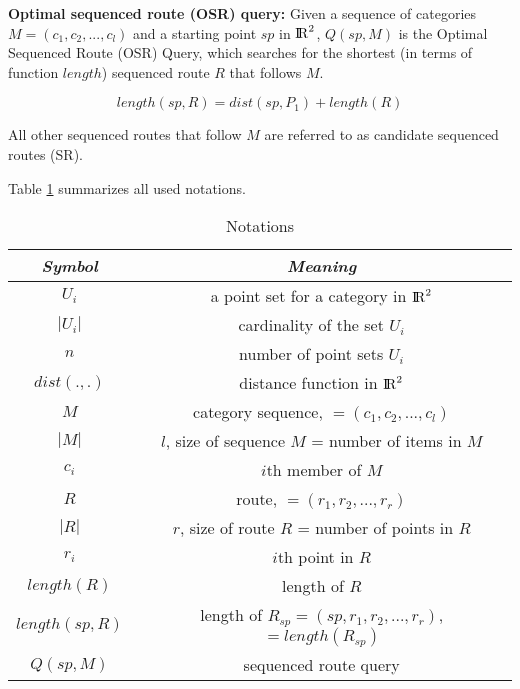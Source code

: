 \textbf{Optimal sequenced route (OSR) query:} Given a sequence of categories $M = (c_1, c_2, ..., c_l)$ and a starting point $sp$ in ${\rm I\!R}^2$, $Q(sp, M)$ is the Optimal Sequenced Route (OSR) Query, which searches for the shortest (in terms of function $length$) sequenced route $R$ that follows $M$.

\begin{equation}
length(sp, R) = dist(sp, P_1) + length(R)
\end{equation}

All other sequenced routes that follow $M$ are referred to as candidate sequenced routes (SR). \newline

Table \ref{table} summarizes all used notations.

\begin{table}[h!]
\centering
	\begin{tabular}{ |c|c| } 
		\hline
		\textit{Symbol} & \textit{Meaning} \\
		\hline
		$U_i$ & a point set for a category in ${\rm I\!R}^2$ \\ 
		\hline
		$|U_i|$ & cardinality of the set $U_i$ \\ 
		\hline
		$n$ & number of point sets $U_i$ \\ 
		\hline
		$dist(., .)$ & distance function in ${\rm I\!R}^2$ \\ 
		\hline
		$M$ & category sequence, $=(c_1, c_2, ..., c_l)$ \\ 
		\hline
		$|M|$ & $l$, size of sequence $M$ = number of items in $M$ \\ 
		\hline
		$c_i$ & $i$th member of $M$ \\ 
		\hline
		$R$ & route, $= (r_1, r_2, ..., r_r)$ \\ 
		\hline
		$|R|$ & $r$, size of route $R$ = number of points in $R$ \\ 
		\hline
		$r_i$ & $i$th point in $R$ \\ 
		\hline
		$length(R)$ & length of $R$ \\ 
		\hline
		$length(sp, R)$ & length of $R_{sp} = (sp, r_1, r_2, ..., r_r)$, $= length(R_{sp})$ \\ 
		\hline
		$Q(sp, M)$ & sequenced route query \\ 
		\hline
	\end{tabular}
\caption{Notations}
\label{table}
\end{table}




